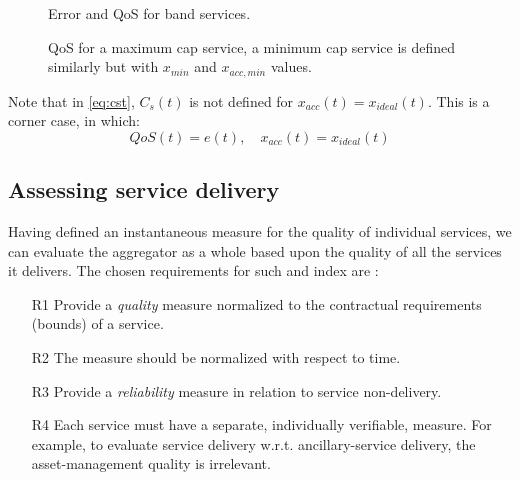 \begin{figure}
\centering
{}
\caption{Error and QoS for band services.}
\label{fig:band_error}
\end{figure}
\begin{figure}
\centering
{}
\caption{QoS for a maximum cap service, a minimum cap service is defined similarly but with $x_{min}$ and $x_{acc,min}$ values.}
\label{fig:cap_error}
\end{figure}

Note that in \eqref{eq:cst}, $C_{s}(t)$ is not defined for $x_{acc}(t) = x_{ideal}(t)$. This is a corner case, in which:
\begin{equation}
QoS(t) = e(t), \quad x_{acc}(t) = x_{ideal}(t)
\end{equation}


\subsection{Assessing service delivery}
Having defined an instantaneous measure for the quality of individual services, we can evaluate the aggregator as a whole based upon the quality of all the services it delivers. The chosen requirements for such and index are \cite{bondy2014performance}:
\begin{itemize}
	\item[R1] Provide a \emph{quality} measure normalized to the contractual requirements (bounds) of a service. 
	\item[R2] The measure should be normalized with respect to time.
	\item[R3] Provide a \emph{reliability} measure in relation to service non-delivery.
	\item[R4] Each service must have a separate, individually verifiable, measure. For example, to evaluate service delivery w.r.t. ancillary-service delivery, the asset-management quality is irrelevant.
\end{itemize}

